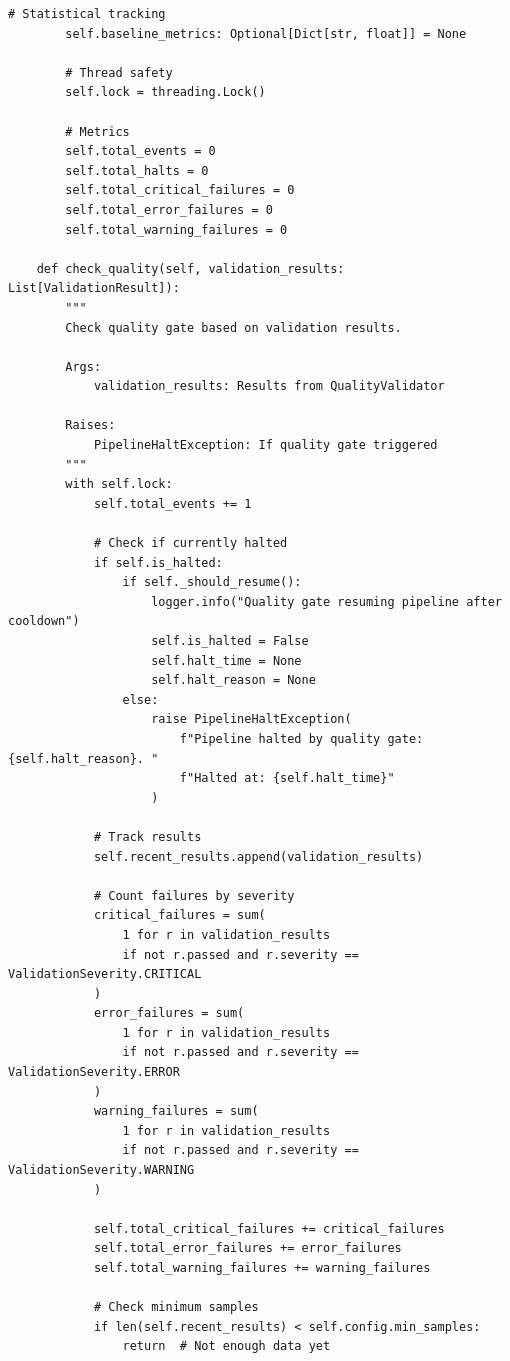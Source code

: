 \begin{lstlisting}[style=python, caption={Data Quality Gate Implementation}]
        # Statistical tracking
        self.baseline_metrics: Optional[Dict[str, float]] = None

        # Thread safety
        self.lock = threading.Lock()

        # Metrics
        self.total_events = 0
        self.total_halts = 0
        self.total_critical_failures = 0
        self.total_error_failures = 0
        self.total_warning_failures = 0

    def check_quality(self, validation_results: List[ValidationResult]):
        """
        Check quality gate based on validation results.

        Args:
            validation_results: Results from QualityValidator

        Raises:
            PipelineHaltException: If quality gate triggered
        """
        with self.lock:
            self.total_events += 1

            # Check if currently halted
            if self.is_halted:
                if self._should_resume():
                    logger.info("Quality gate resuming pipeline after cooldown")
                    self.is_halted = False
                    self.halt_time = None
                    self.halt_reason = None
                else:
                    raise PipelineHaltException(
                        f"Pipeline halted by quality gate: {self.halt_reason}. "
                        f"Halted at: {self.halt_time}"
                    )

            # Track results
            self.recent_results.append(validation_results)

            # Count failures by severity
            critical_failures = sum(
                1 for r in validation_results
                if not r.passed and r.severity == ValidationSeverity.CRITICAL
            )
            error_failures = sum(
                1 for r in validation_results
                if not r.passed and r.severity == ValidationSeverity.ERROR
            )
            warning_failures = sum(
                1 for r in validation_results
                if not r.passed and r.severity == ValidationSeverity.WARNING
            )

            self.total_critical_failures += critical_failures
            self.total_error_failures += error_failures
            self.total_warning_failures += warning_failures

            # Check minimum samples
            if len(self.recent_results) < self.config.min_samples:
                return  # Not enough data yet


\end{lstlisting}
